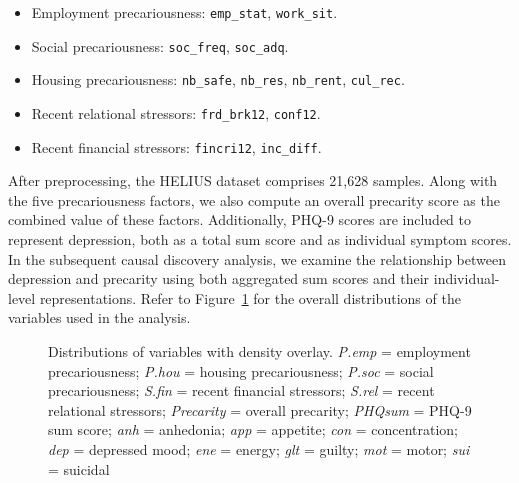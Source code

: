 \documentclass[
]{article}
\providecommand{\tightlist}{%
  \setlength{\itemsep}{0pt}\setlength{\parskip}{0pt}}\usepackage{longtable,booktabs,array}
\begin{document}
\begin{itemize}
\tightlist
\item
  Employment precariousness: \texttt{emp\_stat}, \texttt{work\_sit}.
\item
  Social precariousness: \texttt{soc\_freq}, \texttt{soc\_adq}.
\item
  Housing precariousness: \texttt{nb\_safe}, \texttt{nb\_res},
  \texttt{nb\_rent}, \texttt{cul\_rec}.
\item
  Recent relational stressors: \texttt{frd\_brk12}, \texttt{conf12}.
\item
  Recent financial stressors: \texttt{fincri12}, \texttt{inc\_diff}.
\end{itemize}

After preprocessing, the HELIUS dataset comprises 21,628 samples. Along
with the five precariousness factors, we also compute an overall
precarity score as the combined value of these factors. Additionally,
PHQ-9 scores are included to represent depression, both as a total sum
score and as individual symptom scores. In the subsequent causal
discovery analysis, we examine the relationship between depression and
precarity using both aggregated sum scores and their individual-level
representations. Refer to Figure~\ref{fig-dist} for the overall
distributions of the variables used in the analysis.

\begin{figure}


\caption{\label{fig-dist}Distributions of variables with density
overlay. \emph{P.emp} = employment precariousness; \emph{P.hou} =
housing precariousness; \emph{P.soc} = social precariousness;
\emph{S.fin} = recent financial stressors; \emph{S.rel} = recent
relational stressors; \emph{Precarity} = overall precarity;
\emph{PHQsum} = PHQ-9 sum score; \emph{anh} = anhedonia; \emph{app} =
appetite; \emph{con} = concentration; \emph{dep} = depressed mood;
\emph{ene} = energy; \emph{glt} = guilty; \emph{mot} = motor; \emph{sui}
= suicidal}

\end{figure}%
\end{document}
